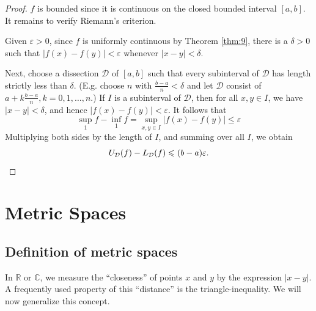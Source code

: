 \documentclass[a4paper,11pt]{article}
\begin{document}
\begin{proof}
    $f$ is bounded since it is continuous on the closed bounded interval $[a, b]$. It remains to verify Riemann's criterion.

    Given $\varepsilon>0$, since $f$ is uniformly continuous by Theorem \ref{thm:9}, there is a $\delta>0$ such that $|f(x)-f(y)|<\varepsilon$ whenever $|x-y|<\delta$.
    
    Next, choose a dissection $\mathcal{D}$ of $[a, b]$ such that every subinterval of $\mathcal{D}$ has length strictly less than $\delta$. (E.g. choose $n$ with $\frac{b-a}{n}<\delta$ and let $\mathcal{D}$ consist of $a+k \frac{b-a}{n}, k=0,1, \ldots, n$.) If $I$ is a subinterval of $\mathcal{D}$, then for all $x, y \in I$, we have $|x-y|<\delta$, and hence $|f(x)-f(y)|<\varepsilon$. It follows that
    \[
    \sup _{1} f-\inf _{1} f=\underset{x, y \in I}{\sup }|f(x)-f(y)| \leqslant \varepsilon
    \]
    Multiplying both sides by the length of $I$, and summing over all $I$, we obtain
    \[
    U_{\mathcal{D}}(f)-L_{\mathcal{D}}(f) \leqslant(b-a) \varepsilon.\qedhere
    \]
\end{proof}

\section{Metric Spaces}
\subsection{Definition of metric spaces}
In $\mathbb{R}$ or $\mathbb{C}$, we measure the ``closeness'' of points $x$ and $y$ by the expression $|x-y|$. A frequently used property of this ``distance'' is the triangle-inequality. We will now generalize this concept.
\end{document}
